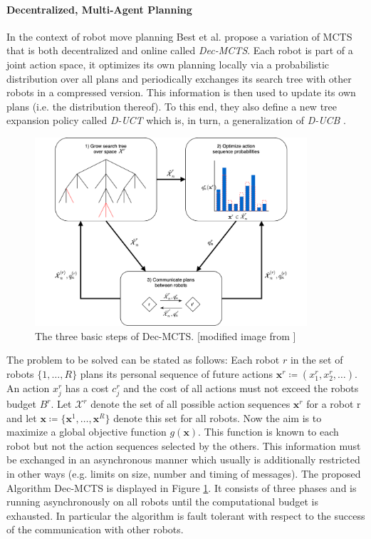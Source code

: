 \paragraph{Decentralized, Multi-Agent Planning}
In the context of robot move planning Best et al. \cite{best2019dec} propose a variation of MCTS that is both decentralized and online called \textit{Dec-MCTS}. Each robot is part of a joint action space, it optimizes its own planning locally via a probabilistic distribution over all plans and periodically exchanges its search tree with other robots in a compressed version. This information is then used to update its own plans (i.e. the distribution thereof). To this end, they also define a new tree expansion policy called \textit{D-UCT} which is, in turn, a generalization of \textit{D-UCB} \cite{garivier2011upper}.

\begin{figure}[ht]
    \centering
    \includegraphics[width=0.9\textwidth]{img/dec-mcts.png}
    \caption{The three basic steps of Dec-MCTS. [modified image from \cite{best2019dec}]}
    \label{fig:dec_mcts}
\end{figure}

The problem to be solved can be stated as follows: Each robot $r$ in the set of robots $\{1,\ldots,R\}$ plans its personal sequence of future actions $ \mathbf{x}^r \coloneqq (x_1^r,x_2^r,\ldots)$. An action $x_j^r$ has a cost $c_j^r$ and the cost of all actions must not exceed the robots budget $B^r$. Let $\mathcal{X}^r$ denote the set of all possible action sequences $\mathbf{x}^r$ for a robot r and let $\mathbf{x} \coloneqq \{\mathbf{x}
^1, \ldots , \mathbf{x}^R\}$ denote this set for all robots. 
Now the aim is to maximize a global objective function $g(\mathbf{x})$. This function is known to each robot but not the action sequences selected by the others. This information must be exchanged in an asynchronous manner which usually is additionally restricted in other ways (e.g. limits on size, number and timing of messages). 
The proposed Algorithm Dec-MCTS is displayed in Figure \ref{fig:dec_mcts}. It consists of three phases and is running asynchronously on all robots until the computational budget is exhausted. In particular the algorithm is fault tolerant with respect to the success of the communication with other robots. 

